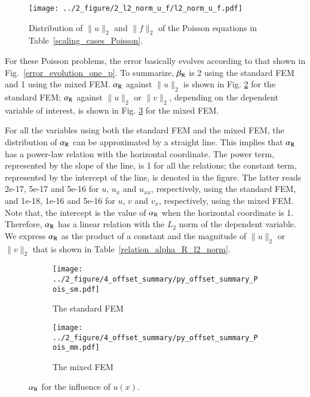 \documentclass[review,3p]{elsarticle}
\begin{document}
\begin{figure}[!ht]
\centering
    \texttt{[image: ../2\_figure/2\_l2\_norm\_u\_f/l2\_norm\_u\_f.pdf]}
    \caption{Distribution of $\|u\|_2$ and $\|f\|_2$ of the Poisson equations in Table~\ref{scaling_cases_Poisson}.}
    \label{l2_norm_u_f}
\end{figure}

For these Poisson problems, the error basically evolves according to that shown in Fig.~\ref{error_evolution_one_p}. To summarize, $\beta_{\rm R}$ is 2 using the standard FEM and 1 using the mixed FEM. $\alpha_{\rm R}$ against $\|u\|_2$ is shown in Fig. \ref{py_offset_summary_Pois_sm} for the standard FEM; $\alpha_{\rm R}$ against $\|u\|_2$ or $\|v\|_2$, depending on the dependent variable of interest, is shown in Fig. \ref{py_offset_summary_Pois_mm} for the mixed FEM.

For all the variables using both the standard FEM and the mixed FEM, the distribution of $\alpha_{\rm R}$ can be approximated by a straight line. This implies that $\alpha_{\rm R}$ has a power-law relation with the horizontal coordinate. The power term, represented by the slope of the line, is 1 for all the relations; the constant term, represented by the intercept of the line, is denoted in the figure. The latter reads 2e-17, 5e-17 and 5e-16 for $u$, $u_x$ and $u_{xx}$, respectively, using the standard FEM, and 1e-18, 1e-16 and 5e-16 for $u$, $v$ and $v_x$, respectively, using the mixed FEM. Note that, the intercept is the value of $\alpha_{\rm R}$ when the horizontal coordinate is 1. Therefore, $\alpha_{\rm R}$ has a linear relation with the $L_2$ norm of the dependent variable. We express $\alpha_{\rm R}$ as the product of a constant and the magnitude of $\|u\|_2$ or $\|v\|_2$ that is shown in Table~\ref{relation_alpha_R_l2_norm}.

\begin{figure}[!ht]
	\centering
    \begin{subfigure}{6.0cm}
        \texttt{[image: ../2\_figure/4\_offset\_summary/py\_offset\_summary\_Pois\_sm.pdf]}
        \caption{The standard FEM}
        \label{py_offset_summary_Pois_sm}
    \end{subfigure}
    \hspace{-0.2cm}
    \begin{subfigure}{6.0cm}
        \texttt{[image: ../2\_figure/4\_offset\_summary/py\_offset\_summary\_Pois\_mm.pdf]}
        \caption{The mixed FEM}
        \label{py_offset_summary_Pois_mm}
    \end{subfigure}
\caption{$\alpha_{\rm R}$ for the influence of $u(x)$.}
\label{py_offset_summary_Pois}
\end{figure}
\end{document}
